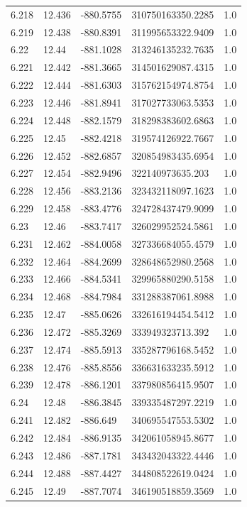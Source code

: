 \begin{tabular}{lllll}
6.218 & 12.436 & -880.5755 & 310750163350.2285 & 1.0 \\
6.219 & 12.438 & -880.8391 & 311995653322.9409 & 1.0 \\
6.22 & 12.44 & -881.1028 & 313246135232.7635 & 1.0 \\
6.221 & 12.442 & -881.3665 & 314501629087.4315 & 1.0 \\
6.222 & 12.444 & -881.6303 & 315762154974.8754 & 1.0 \\
6.223 & 12.446 & -881.8941 & 317027733063.5353 & 1.0 \\
6.224 & 12.448 & -882.1579 & 318298383602.6863 & 1.0 \\
6.225 & 12.45 & -882.4218 & 319574126922.7667 & 1.0 \\
6.226 & 12.452 & -882.6857 & 320854983435.6954 & 1.0 \\
6.227 & 12.454 & -882.9496 & 322140973635.203 & 1.0 \\
6.228 & 12.456 & -883.2136 & 323432118097.1623 & 1.0 \\
6.229 & 12.458 & -883.4776 & 324728437479.9099 & 1.0 \\
6.23 & 12.46 & -883.7417 & 326029952524.5861 & 1.0 \\
6.231 & 12.462 & -884.0058 & 327336684055.4579 & 1.0 \\
6.232 & 12.464 & -884.2699 & 328648652980.2568 & 1.0 \\
6.233 & 12.466 & -884.5341 & 329965880290.5158 & 1.0 \\
6.234 & 12.468 & -884.7984 & 331288387061.8988 & 1.0 \\
6.235 & 12.47 & -885.0626 & 332616194454.5412 & 1.0 \\
6.236 & 12.472 & -885.3269 & 333949323713.392 & 1.0 \\
6.237 & 12.474 & -885.5913 & 335287796168.5452 & 1.0 \\
6.238 & 12.476 & -885.8556 & 336631633235.5912 & 1.0 \\
6.239 & 12.478 & -886.1201 & 337980856415.9507 & 1.0 \\
6.24 & 12.48 & -886.3845 & 339335487297.2219 & 1.0 \\
6.241 & 12.482 & -886.649 & 340695547553.5302 & 1.0 \\
6.242 & 12.484 & -886.9135 & 342061058945.8677 & 1.0 \\
6.243 & 12.486 & -887.1781 & 343432043322.4446 & 1.0 \\
6.244 & 12.488 & -887.4427 & 344808522619.0424 & 1.0 \\
6.245 & 12.49 & -887.7074 & 346190518859.3569 & 1.0 \\

\end{tabular}
